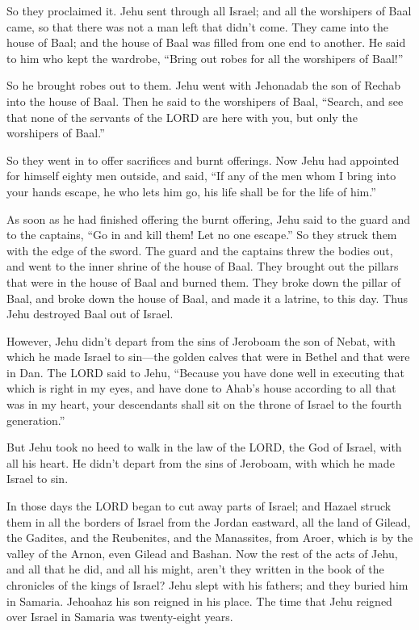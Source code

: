 So they proclaimed it.
\myverse{}Jehu sent through all Israel; and all the worshipers of Baal came, so that
there was not a man left that didn’t come. They came into the house of Baal; and the house of Baal was
filled from one end to another.
\myverse{}He said to him who kept the wardrobe, “Bring out robes for all the worshipers
of Baal!”

So he brought robes out to them.
\myverse{}Jehu went with Jehonadab the son of Rechab into the house of Baal. Then he
said to the worshipers of Baal, “Search, and see that none of the servants of the LORD are here with you,
but only the worshipers of Baal.”

\myverse{}So they went in to offer sacrifices and burnt offerings. Now
Jehu had appointed for himself eighty men outside, and said, “If any of the men whom I bring into your
hands escape, he who lets him go, his life shall be for the life of him.”

\myverse{}As soon as he had finished offering the burnt offering, Jehu
said to the guard and to the captains, “Go in and kill them! Let no one escape.” So they struck them with
the edge of the sword. The guard and the captains threw the bodies out, and went to the inner shrine of
the house of Baal.
\myverse{}They brought out the pillars that were in the house of Baal and burned them.
\myverse{}They broke down the pillar of Baal, and broke down the house of Baal, and
made it a latrine, to this day.
\myverse{}Thus Jehu destroyed Baal out of Israel.

\myverse{}However, Jehu didn’t depart from the sins of Jeroboam the son
of Nebat, with which he made Israel to sin—the golden calves that were in Bethel and that were in Dan.
\myverse{}The LORD said to Jehu, “Because you have done well in executing that which
is right in my eyes, and have done to Ahab’s house according to all that was in my heart, your descendants
shall sit on the throne of Israel to the fourth generation.”

\myverse{}But Jehu took no heed to walk in the law of the LORD, the God
of Israel, with all his heart. He didn’t depart from the sins of Jeroboam, with which he made Israel to
sin.

\myverse{}In those days the LORD began to cut away parts of Israel; and
Hazael struck them in all the borders of Israel
\myverse{}from the Jordan eastward, all the land of Gilead, the Gadites, and the Reubenites,
and the Manassites, from Aroer, which is by the valley of the Arnon, even Gilead and Bashan.
\myverse{}Now the rest of the acts of Jehu, and all that he did, and all his might,
aren’t they written in the book of the chronicles of the kings of Israel?
\myverse{}Jehu slept with his fathers; and they buried him in Samaria. Jehoahaz his
son reigned in his place.
\myverse{}The time that Jehu reigned over Israel in Samaria was twenty-eight years.


